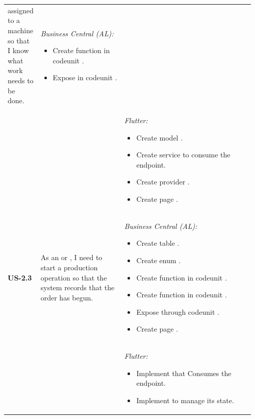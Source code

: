 \begin{longtable}{@{} P{0.09\linewidth} P{0.34\linewidth} P{0.53\linewidth} @{}}
 assigned to a machine so that I know what work needs
  to be done.
  & \noindent\textit{Business Central (AL):}
  \begin{itemize}[nosep, leftmargin=*]
    \item Create function  in codeunit .
    \item Expose   in codeunit .
  \end{itemize}
\\ & &
  \noindent\textit{Flutter:}
  \begin{itemize}[nosep, leftmargin=*]
    \item Create model .
    \item Create service  to consume the  endpoint.
    \item Create provider .
    \item Create page .
  \end{itemize}\\
  \midrule
  \textbf{US-2.3}
  & As an  or , I need to start a
  production operation so that the system records that the order has begun.
  & \noindent\textit{Business Central (AL):}
  \begin{itemize}[nosep, leftmargin=*]
    \item Create table .
    \item Create enum .
    \item Create function  in codeunit .
    \item Create function  in codeunit .
    \item Expose  through codeunit .
    \item Create page .
  \end{itemize}
\\ & &
  \noindent\textit{Flutter:}
  \begin{itemize}[nosep, leftmargin=*]
    \item Implement  that Consumes the  endpoint.
    \item Implement  to manage its state.

\end{itemize}
\end{longtable}
